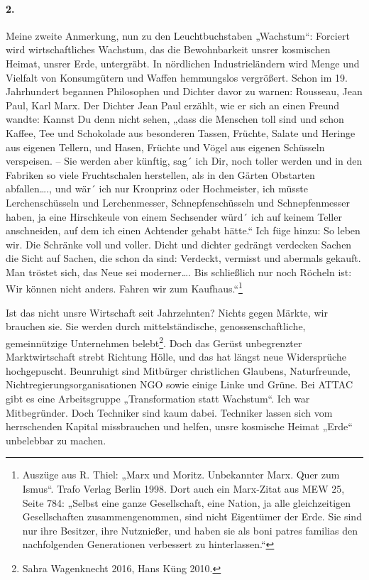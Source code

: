 \documentclass[12pt,a4paper]{article}
\begin{document}
\paragraph{2.}
Meine zweite Anmerkung, nun zu den Leuchtbuchstaben „Wachstum“: Forciert wird
wirtschaftliches Wachstum, das die Bewohnbarkeit unsrer kosmischen Heimat,
unsrer Erde, untergräbt. In nördlichen Industrieländern wird Menge und Vielfalt
von Konsumgütern und Waffen hemmungslos vergrößert. Schon im 19. Jahrhundert
begannen Philosophen und Dichter davor zu warnen: Rousseau, Jean Paul, Karl
Marx. Der Dichter Jean Paul erzählt, wie er sich an einen Freund wandte: Kannst
Du denn nicht sehen, „dass die Menschen toll sind und schon Kaffee, Tee und
Schokolade aus besonderen Tassen, Früchte, Salate und Heringe aus eigenen
Tellern, und Hasen, Früchte und Vögel aus eigenen Schüsseln verspeisen. – Sie
werden aber künftig, sag´ ich Dir, noch toller werden und in den Fabriken so
viele Fruchtschalen herstellen, als in den Gärten Obstarten abfallen…., und
wär´ ich nur Kronprinz oder Hochmeister, ich müsste Lerchenschüsseln und
Lerchenmesser, Schnepfenschüsseln und Schnepfenmesser haben, ja eine
Hirschkeule von einem Sechsender würd´ ich auf keinem Teller anschneiden, auf
dem ich einen Achtender gehabt hätte.“ Ich füge hinzu: So leben wir. Die
Schränke voll und voller. Dicht und dichter gedrängt verdecken Sachen die Sicht
auf Sachen, die schon da sind: Verdeckt, vermisst und abermals gekauft. Man
tröstet sich, das Neue sei moderner…. Bis schließlich nur noch Röcheln ist: Wir
können nicht anders. Fahren wir zum Kaufhaus.“\footnote{Auszüge aus R. Thiel:
  „Marx und Moritz. Unbekannter Marx. Quer zum Ismus“. Trafo Verlag Berlin
  1998.  Dort auch ein Marx-Zitat aus MEW 25, Seite 784: „Selbst eine ganze
  Gesellschaft, eine Nation, ja alle gleichzeitigen Gesellschaften
  zusammengenommen, sind nicht Eigentümer der Erde. Sie sind nur ihre Besitzer,
  ihre Nutznießer, und haben sie als boni patres familias den nachfolgenden
  Generationen verbessert zu hinterlassen.“}

Ist das nicht unsre Wirtschaft seit Jahrzehnten? Nichts gegen Märkte, wir
brauchen sie. Sie werden durch mittelständische, genossenschaftliche,
gemeinnützige Unternehmen belebt\footnote{Sahra Wagenknecht 2016, Hans Küng
  2010.}.  Doch das Gerüst unbegrenzter Marktwirtschaft strebt Richtung Hölle,
und das hat längst neue Widersprüche hochgepuscht. Beunruhigt sind Mitbürger
christlichen Glaubens, Naturfreunde, Nichtregierungsorganisationen NGO sowie
einige Linke und Grüne. Bei ATTAC gibt es eine Arbeitsgruppe „Transformation
statt Wachstum“. Ich war Mitbegründer. Doch Techniker sind kaum dabei.
Techniker lassen sich vom herrschenden Kapital missbrauchen und helfen, unsre
kosmische Heimat „Erde“ unbelebbar zu machen.
\end{document}
